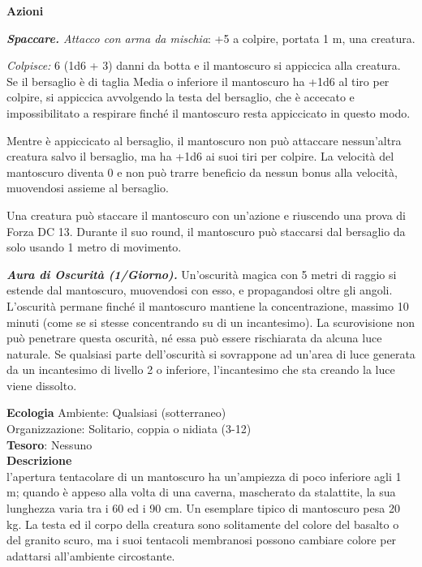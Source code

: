 \begin{multicols}{2}
\textbf{Azioni}

\textit{\textbf{Spaccare.} Attacco con arma da mischia}: +5 a colpire, portata 1 m, una creatura.

\textit{Colpisce:} 6 (1d6 + 3) danni da botta e il mantoscuro si appiccica alla creatura. Se il bersaglio è di taglia Media o inferiore il mantoscuro ha +1d6 al tiro per colpire, si appiccica avvolgendo la testa del bersaglio, che è accecato e impossibilitato a respirare finché il mantoscuro resta appiccicato in questo modo.

Mentre è appiccicato al bersaglio, il mantoscuro non può attaccare nessun'altra creatura salvo il bersaglio, ma ha +1d6 ai suoi tiri per colpire. La velocità del mantoscuro diventa 0 e non può trarre beneficio da nessun bonus alla velocità, muovendosi assieme al bersaglio.

Una creatura può staccare il mantoscuro con un'azione e riuscendo una prova di Forza DC 13. Durante il suo round, il mantoscuro può staccarsi dal bersaglio da solo usando 1 metro di movimento.

\textit{\textbf{Aura di Oscurità (1/Giorno).}} Un'oscurità magica con 5 metri di raggio si estende dal mantoscuro, muovendosi con esso, e propagandosi oltre gli angoli. L'oscurità permane finché il mantoscuro mantiene la concentrazione, massimo 10 minuti (come se si stesse concentrando su di un incantesimo). La scurovisione non può penetrare questa oscurità, né essa può essere rischiarata da alcuna luce naturale. Se qualsiasi parte dell'oscurità si sovrappone ad un'area di luce generata da un incantesimo di livello 2 o inferiore, l'incantesimo che sta creando la luce viene dissolto.

\textbf{Ecologia}
Ambiente: Qualsiasi (sotterraneo)\\
Organizzazione: Solitario, coppia o nidiata (3-12)\\
\textbf{Tesoro}: Nessuno\\
\textbf{Descrizione}\\
l'apertura tentacolare di un mantoscuro ha un'ampiezza di poco inferiore agli 1 m; quando è appeso alla volta di una caverna, mascherato da stalattite, la sua lunghezza varia tra i 60 ed i 90 cm. Un esemplare tipico di mantoscuro pesa 20 kg. La testa ed il corpo della creatura sono solitamente del colore del basalto o del granito scuro, ma i suoi tentacoli membranosi possono cambiare colore per adattarsi all'ambiente circostante.


\end{multicols}
